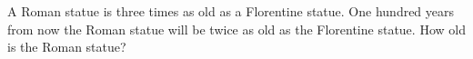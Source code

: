 A Roman statue is three times as old as a Florentine statue. One hundred years from now the Roman statue will be twice as old as the Florentine statue. How old is the Roman statue?
